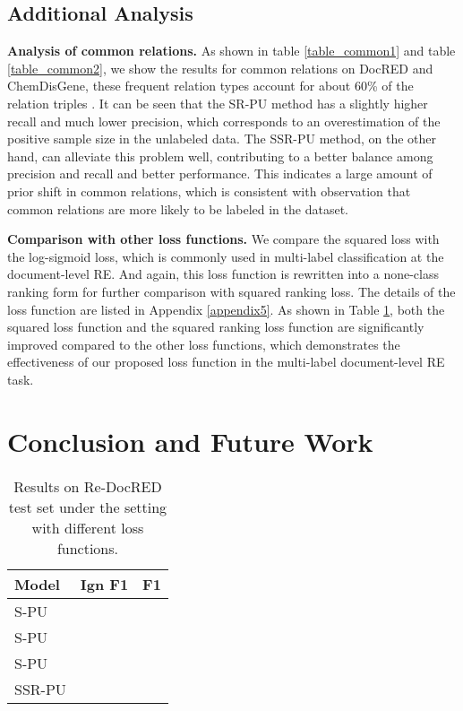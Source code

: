 \documentclass[11pt]{article}
\begin{document}
\subsection{Additional Analysis}

\textbf{Analysis of common relations.} \enspace As shown in table \ref{table_common1} and table \ref{table_common2}, we show the results for common relations on DocRED and ChemDisGene, these frequent relation types account for about 60\% of the relation triples \citep{tan2022revisiting,zhang-etal-2022-distant}. It can be seen that the SR-PU method has a slightly higher recall and much lower precision, which corresponds to an overestimation of the positive sample size in the unlabeled data. The SSR-PU method, on the other hand, can alleviate this problem well, contributing to a better balance among precision and recall and better performance. This indicates a large amount of prior shift in common relations, which is consistent with \citep{huang-etal-2022-recommend} observation that common relations are more likely to be labeled in the dataset.

\textbf{Comparison with other loss functions.} \label{c4} \enspace We compare the squared loss with the log-sigmoid loss, which is commonly used in multi-label classification at the document-level RE. And again, this loss function is rewritten into a none-class ranking form for further comparison with squared ranking loss. The details of the loss function are listed in Appendix \ref{appendix5}. As shown in Table \ref{table6}, both the squared loss function and the squared ranking loss function are significantly improved compared to the other loss functions, which demonstrates the effectiveness of our proposed loss function in the multi-label document-level RE task.

\section{Conclusion and Future Work}

\begin{table}
\centering
\begin{tabular}{lcc}
\hline \textbf{Model} & \textbf{Ign F1} & \textbf{F1} \\
\hline
S-PU &  &  \\
S-PU &  &  \\
\hline
S-PU &  &  \\
SSR-PU &  &  \\
\hline
\end{tabular}
\caption{\label{table6}
Results on Re-DocRED test set under the  setting with different loss functions.
}
\end{table}
\end{document}
